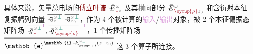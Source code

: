 具体来说，\textcolor{PineGreen}{矢量总电场}的\textcolor{Maroon}{傅立叶谱} $\xint{\mathcolor{gray}{-}}{25}{\bar{E}}^{\;\!\mathcolor{gray}{\omega}}_{\;\! \textcolor{Maroon}{\Yup} \mathcolor{gray}{z}}$ 及其\textcolor{gray}{横向}部分 $\xint{\mathcolor{gray}{-}}{25}{\bar{E}}^{\;\!\mathcolor{gray}{\omega}}_{\;\! \textcolor{Maroon}{\symup{\rho}} \mathcolor{gray}{z_0}}$ 和\textcolor{NavyBlue}{含衍射}\textcolor{PineGreen}{本征复振幅}列向量 $\overline{\xint{\mathcolor{gray}{-}}{16}{\mathtt{G}}^{\;\!\mathcolor{gray}{\omega} \textcolor{PineGreen}{\pm}}_{\;\! \mathcolor{gray}{z}}},\overline{\xint{\mathcolor{gray}{-}}{16}{\mathtt{G}}^{\;\!\mathcolor{gray}{\omega} \textcolor{PineGreen}{\pm}}_{\;\! \mathcolor{gray}{z_0}}}$，作为 4 个被计算的\textcolor{Plum}{输入}/\textcolor{Plum}{输出}对象，被 2 个\textcolor{PineGreen}{本征偏振态矩阵场} $\overline{\xint{{}^{}_{\mathcolor{gray}{-}}}{10}{\bar{g}}^{\;\!\mathcolor{gray}{\omega} \textcolor{PineGreen}{\pm}}_{\;\! \textcolor{Maroon}{\Yup}}}^{\mathsf{\textcolor{Plum}{T}}}, \overline{\xint{{}^{}_{\mathcolor{gray}{-}}}{10}{\bar{g}}^{\;\!\mathcolor{gray}{\omega} \textcolor{PineGreen}{\pm}}_{\;\! \textcolor{Maroon}{\symup{\rho}}}}^{\textcolor{Plum}{-\mathsf{T}}}$，1 个\textcolor{PineGreen}{传播矩阵场} $\overline{\overline{\mathbb{e}^{\mathbb{i} \xint{\begin{smallmatrix} ~ \\ {}^{}_{\mathcolor{gray}{-}} \\ ~ \end{smallmatrix}}{15}{k}_{\symup{z}}^{\;\! \mathcolor{gray}{\omega} \textcolor{PineGreen}{\pm}} \left( \mathcolor{gray}{z} - \mathcolor{gray}{z_0} \right)}}}$ 这 3 个算子所连接。

\clearpage

